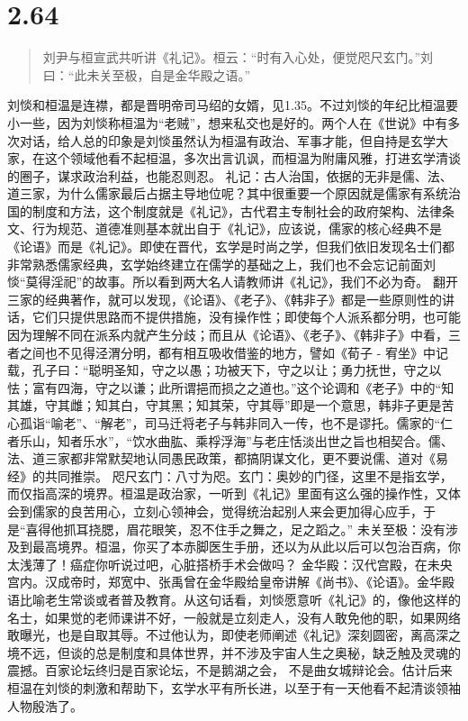 \documentclass[]{book}
\begin{document}
\section{2.64}\label{section-110}

\begin{quote}
刘尹与桓宣武共听讲《礼记》。桓云：``时有入心处，便觉咫尺玄门。''刘曰：``此未关至极，自是金华殿之语。''
\end{quote}

刘惔和桓温是连襟，都是晋明帝司马绍的女婿，见1.35。不过刘惔的年纪比桓温要小一些，因为刘惔称桓温为``老贼''，想来私交也是好的。两个人在《世说》中有多次对话，给人总的印象是刘惔虽然认为桓温有政治、军事才能，但自持是玄学大家，在这个领域他看不起桓温，多次出言讥讽，而桓温为附庸风雅，打进玄学清谈的圈子，谋求政治利益，也能忍则忍。
礼记：古人治国，依据的无非是儒、法、道三家，为什么儒家最后占据主导地位呢？其中很重要一个原因就是儒家有系统治国的制度和方法，这个制度就是《礼记》，古代君主专制社会的政府架构、法律条文、行为规范、道德准则基本就出自于《礼记》，应该说，儒家的核心经典不是《论语》而是《礼记》。即使在晋代，玄学是时尚之学，但我们依旧发现名士们都非常熟悉儒家经典，玄学始终建立在儒学的基础之上，我们也不会忘记前面刘惔``莫得淫祀''的故事。所以看到两大名人请教师讲《礼记》，我们不必为奇。
翻开三家的经典著作，就可以发现，《论语》、《老子》、《韩非子》都是一些原则性的讲话，它们只提供思路而不提供措施，没有操作性；即使每个人派系都分明，也可能因为理解不同在派系内就产生分歧；而且从《论语》、《老子》、《韩非子》中看，三者之间也不见得泾渭分明，都有相互吸收借鉴的地方，譬如《荀子
-
宥坐》中记载，孔子曰：``聪明圣知，守之以愚；功被天下，守之以让；勇力抚世，守之以怯；富有四海，守之以谦；此所谓挹而损之之道也。''这个论调和《老子》中的``知其雄，守其雌；知其白，守其黑；知其荣，守其辱''即是一个意思，韩非子更是苦心孤诣``喻老''、``解老''，司马迁将老子与韩非同入一传，也不是谬托。儒家的``仁者乐山，知者乐水''，``饮水曲肱、乘桴浮海''与老庄恬淡出世之旨也相契合。儒、法、道三家都非常默契地认同愚民政策，都搞阴谋文化，更不要说儒、道对《易经》的共同推崇。
咫尺玄门：八寸为咫。玄门：奥妙的门径，这里不是指玄学，而仅指高深的境界。桓温是政治家，一听到《礼记》里面有这么强的操作性，又体会到儒家的良苦用心，立刻心领神会，觉得统治起别人来会更加得心应手，于是``喜得他抓耳挠腮，眉花眼笑，忍不住手之舞之，足之蹈之。''
未关至极：没有涉及到最高境界。桓温，你买了本赤脚医生手册，还以为从此以后可以包治百病，你太浅薄了！癌症你听说过吧，心脏搭桥手术会做吗？
金华殿：汉代宫殿，在未央宫内。汉成帝时，郑宽中、张禹曾在金华殿给皇帝讲解《尚书》、《论语》。金华殿语比喻老生常谈或者普及教育。从这句话看，刘惔愿意听《礼记》的，像他这样的名士，如果觉的老师课讲不好，一般就是立刻走人，没有人敢免他的职，如果网络敢曝光，也是自取其辱。不过他认为，即使老师阐述《礼记》深刻圆密，离高深之境不远，但谈的总是制度和具体世界，并不涉及宇宙人生之奥秘，缺乏触及灵魂的震撼。百家论坛终归是百家论坛，不是鹅湖之会，
不是曲女城辩论会。估计后来桓温在刘惔的刺激和帮助下，玄学水平有所长进，以至于有一天他看不起清谈领袖人物殷浩了。
\end{document}
